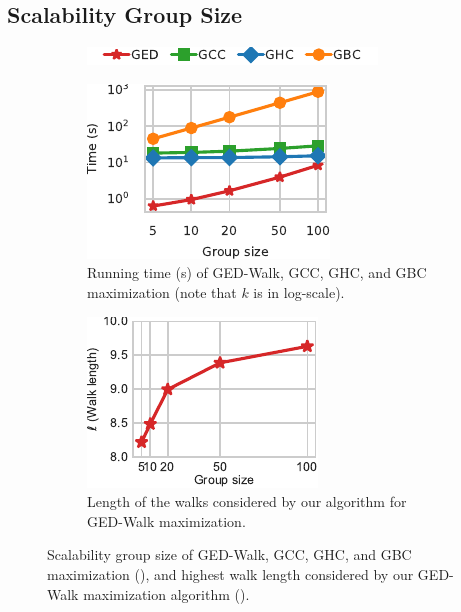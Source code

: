 \subsection{Scalability \wrt Group Size}
\label{sec:ged-walk:exp-scalability-k}
%
\begin{figure}[tb]
\centering
\begin{subfigure}[t]{\textwidth}
\centering
\includegraphics{./sources/plots/ged-walk/legend-ged-time-vs-group.pdf}
\end{subfigure}\medskip

\hfill
\begin{subfigure}[t]{.45\textwidth}
\centering
\includegraphics{./sources/plots/ged-walk/ged-time-vs-group.pdf}
\caption{Running time (s) of GED-Walk, GCC, GHC, and GBC maximization (note that $k$ is
in log-scale).}
\label{fig:ged-walk:scal-wrt-k}
\end{subfigure}\hfill
\begin{subfigure}[t]{.45\textwidth}
\centering
\includegraphics{./sources/plots/ged-walk/scalability-walk-length.pdf}
\caption{Length of the walks considered by our algorithm for GED-Walk maximization.}
\label{fig:ged-walk:scal-ell}
\end{subfigure}\hfill

\caption{Scalability \wrt group size of GED-Walk, GCC, GHC, and GBC maximization
(), and highest walk length considered by our
GED-Walk maximization algorithm ().}
\label{fig:ged-walk:scalability-k-ell}
\end{figure}

